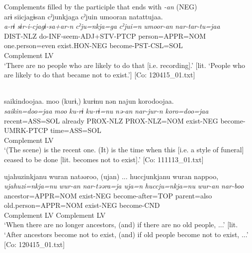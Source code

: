 \ea   Complements filled by the participle that ends with \textit{{}-an} (NEG) \label{ex:9.39}
 \ea{}\\
    \gllll  arɨ  siicjagɨsan  cˀjunkjaga   cˀjuin  umooran  natattujaa.\\
      \textit{a-rɨ}  \textit{sɨr-i-cjagɨ-sa+ar-n}  \textit{cˀju=nkja=ga} \textit{cˀjui=n}  \textit{umoor-an}  \textit{nar{}-tar-tu=jaa}\\
      DIST-NLZ  do-INF-seem-ADJ+STV-PTCP  person=APPR=NOM  one.person=even  exist.HON-NEG  become-PST-CSL=SOL\\
                                                             Complement  LV\\
      \glt       ‘There are no people who are likely to do that [i.e. recording].’ [lit. ‘People who are likely to do that became not to exist.’] [Co: 120415\_01.txt]

  \ex{}\\
    \gllll {\textbar}saikin{\textbar}doojaa.  {\textbar}moo{\textbar}  (kurɨ,)  kurɨnu  nən  najun  {\textbar}koro{\textbar}doojaa.\\
      \textit{saikin=doo=jaa}  \textit{moo}  \textit{ku-rɨ}  \textit{ku-rɨ=nu}  \textit{nə-an}  \textit{nar{}-jur-n  koro=doo=jaa}\\
      recent=ASS=SOL  already  PROX-NLZ  PROX-NLZ=NOM  exist-NEG  become-UMRK-PTCP  time=ASS=SOL\\
          {}             {}        {}          {}          Complement  LV \\
      \glt ‘(The scene) is the recent one. (It) is the time when this [i.e. a style of funeral] ceased to be done [lit. becomes not to exist].’   [Co: 111113\_01.txt]

\ex \label{ex:9.39c} %
    \gllll  ujahuzinkjanu  wuran  natəəroo,  (ujan)  ...  huccjunkjanu  wuran  nappoo,\\
      \textit{ujahuzi=nkja=nu}  \textit{wur-an}  \textit{nar{}-təəra=ja  uja=n} \textit{huccju=nkja=nu}  \textit{wur-an}  \textit{nar{}-boo}\\
      ancestor=APPR=NOM  exist-NEG  become-after=TOP  parent=also  old.person=APPR=NOM  exist-NEG  become-CND\\
        Complement  LV                                              Complement  LV\\
      \glt       ‘When there are no longer ancestors, (and) if there are no old people, ...’ [lit. ‘After ancestors become not to exist, (and) if old people become not to exist, ...’ [Co: 120415\_01.txt]


